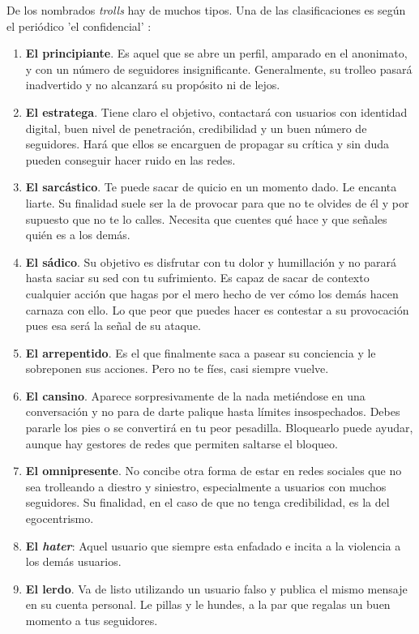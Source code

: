 \documentclass[../all.tex]{subfiles}
\begin{document}
    \newline
    De los nombrados \textit{trolls} hay de muchos tipos. Una de las clasificaciones es según el periódico 'el confidencial' \cite{relacionado6}:
    \begin{enumerate}[resume]
        \item \textbf{El principiante}. Es aquel que se abre un perfil, amparado en el anonimato, y con un número de seguidores insignificante. Generalmente, su trolleo pasará inadvertido y no alcanzará su propósito ni de lejos.
        \item \textbf{El estratega}. Tiene claro el objetivo, contactará con usuarios con identidad digital, buen nivel de penetración, credibilidad y un buen número de seguidores. Hará que ellos se encarguen de propagar su crítica y sin duda pueden conseguir hacer ruido en las redes.
        \item \textbf{El sarcástico}. Te puede sacar de quicio en un momento dado. Le encanta liarte. Su finalidad suele ser la de provocar para que no te olvides de él y por supuesto que no te lo calles. Necesita que cuentes qué hace y que señales quién es a los demás.
        \item \textbf{El sádico}. Su objetivo es disfrutar con tu dolor y humillación y no parará hasta saciar su sed con tu sufrimiento. Es capaz de sacar de contexto cualquier acción que hagas por el mero hecho de ver cómo los demás hacen carnaza con ello. Lo que peor que puedes hacer es contestar a su provocación pues esa será la señal de su ataque.
        \item \textbf{El arrepentido}. Es el que finalmente saca a pasear su conciencia y le sobreponen sus acciones. Pero no te fíes, casi siempre vuelve.
        \item \textbf{El cansino}. Aparece sorpresivamente de la nada metiéndose en una conversación y no para de darte palique hasta límites insospechados. Debes pararle los pies o se convertirá en tu peor pesadilla. Bloquearlo puede ayudar, aunque hay gestores de redes que permiten saltarse el bloqueo.
        \item \textbf{El omnipresente}. No concibe otra forma de estar en redes sociales que no sea trolleando a diestro y siniestro, especialmente a usuarios con muchos seguidores. Su finalidad, en el caso de que no tenga credibilidad, es la del egocentrismo.
        \item \textbf{El \textit{hater}}: Aquel usuario que siempre esta enfadado e incita a la violencia a los demás usuarios.
        \item \textbf{El lerdo}. Va de listo utilizando un usuario falso y publica el mismo mensaje en su cuenta personal. Le pillas y le hundes, a la par que regalas un buen momento a tus seguidores.

\end{enumerate}
\end{document}
